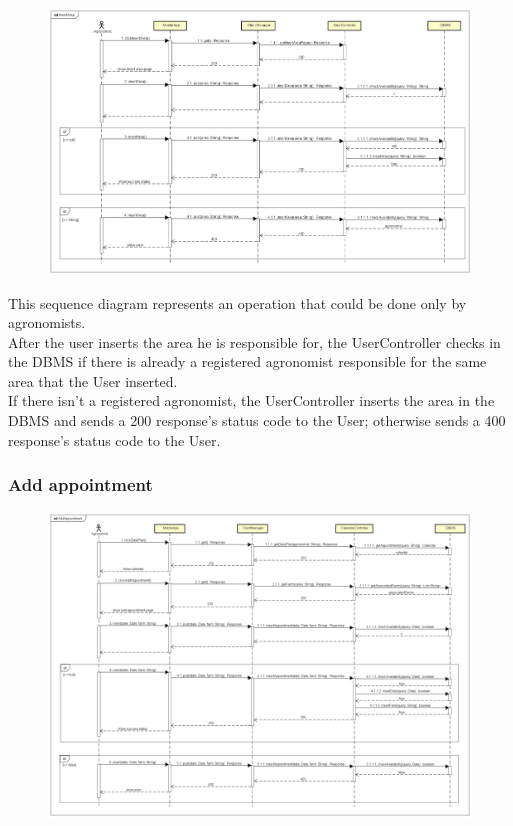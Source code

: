 \begin{figure}[H]
    \begin{center}
        \includegraphics[width=\textwidth]{Images/SequenceDiagrams/InsertAreaDD.png}
    \end{center}
\end{figure}

This sequence diagram represents an operation that could be done only by agronomists.\\
After the user inserts the area he is responsible for, the UserController checks in the 
DBMS if there is already a registered agronomist responsible for the same area that the User inserted.\\
If there isn't a registered agronomist, the UserController inserts the area in the DBMS and sends a 200 
response's status code to the User; otherwise sends a 400 response's status code to the User.


\newpage
\subsubsection{Add appointment}

\begin{figure}[H]
    \begin{center}
        \includegraphics[width=\textwidth]{Images/SequenceDiagrams/AddAppointmentDD.png}
    \end{center}
\end{figure}

